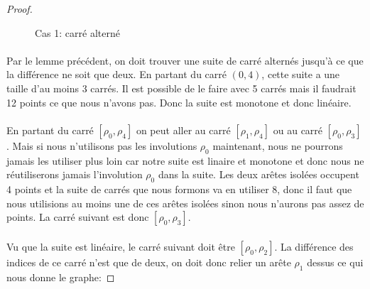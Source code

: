 \begin{proof}
\begin{figure}[H]
\begin{center}
      \caption{Cas 1: carré alterné}
    \end{center}
  \end{figure}

  \paragraph{}
  Par le lemme précédent, on doit trouver une suite de carré alternés jusqu'à ce que la différence ne soit que deux. En partant du carré $(0,4)$, cette suite a une taille d'au moins 3 carrés. Il est possible de le faire avec 5 carrés mais il faudrait 12 points ce que nous n'avons pas. Donc la suite est monotone et donc linéaire.

  \paragraph{}
  En partant du carré $[\rho_0,\rho_4]$ on peut aller au carré $[\rho_1,\rho_4]$ ou au carré $[\rho_0,\rho_3]$. Mais si nous n'utilisons pas les involutions $\rho_0$ maintenant, nous ne pourrons jamais les utiliser plus loin car notre suite est linaire et monotone et donc nous ne réutiliserons jamais l'involution $\rho_0$ dans la suite. Les deux arêtes isolées occupent 4 points et la suite de carrés que nous formons va en utiliser 8, donc il faut que nous utilisions au moins une de ces arêtes isolées sinon nous n'aurons pas assez de points. La carré suivant est donc $[\rho_0,\rho_3]$.

  \paragraph{}
  Vu que la suite est linéaire, le carré suivant doit être $[\rho_0, \rho_2]$. La différence des indices de ce carré n'est que de deux, on doit donc relier un arête $\rho_1$ dessus ce qui nous donne le graphe:



\end{proof}
